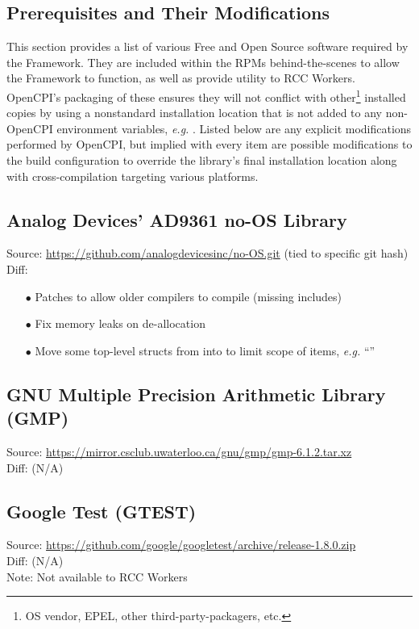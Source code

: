 \newpage
\begin{appendices}
\appendix

\section{Prerequisites and Their Modifications}
This section provides a list of various Free and Open Source software required by the Framework. They are included within the RPMs behind-the-scenes to allow the Framework to function, as well as provide utility to RCC Workers.
OpenCPI's packaging of these ensures they will not conflict with other\footnote{OS vendor, EPEL, other third-party-packagers, etc.} installed copies by using a nonstandard installation location that is not added to any non-OpenCPI environment variables, \textit{e.g.} .
Listed below are any explicit modifications performed by OpenCPI, but implied with every item are possible modifications to the build configuration to override the library's final installation location along with cross-compilation targeting various platforms.

\subsection{Analog Devices' AD9361 no-OS Library}
\label{App:ad9361}
Source: \url{https://github.com/analogdevicesinc/no-OS.git} (tied to specific git hash)\\
Diff: 
\begin{enumerate}
\item[$\bullet$] Patches to allow older compilers to compile (missing  includes)
\item[$\bullet$] Fix memory leaks on de-allocation
\item[$\bullet$] Move some top-level structs from  into  to limit scope of items, \textit{e.g.} ``''
\end{enumerate}

\subsection{GNU Multiple Precision Arithmetic Library (GMP)}
\label{App:gmp}
Source: \url{https://mirror.csclub.uwaterloo.ca/gnu/gmp/gmp-6.1.2.tar.xz}\\
Diff: (N/A)

\subsection{Google Test (GTEST)}
\label{App:gtest}
Source: \url{https://github.com/google/googletest/archive/release-1.8.0.zip}\\
Diff: (N/A)\\
Note: Not available to RCC Workers


\end{appendices}
